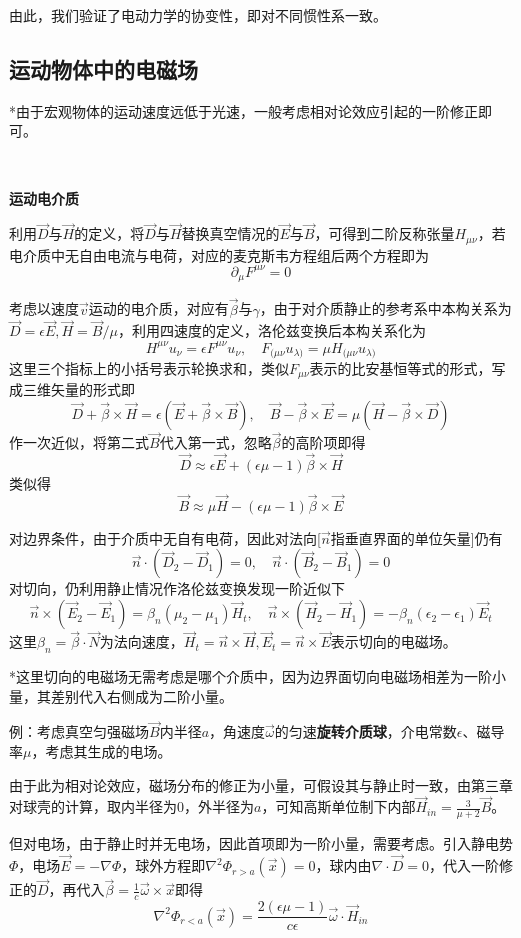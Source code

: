 \documentclass[a4paper,UTF8,fontset=windows]{ctexart}
\newcommand*{\vb}{\vec{B}}
\newcommand*{\vd}{\vec{D}}
\newcommand*{\ve}{\vec{E}}
\newcommand*{\vh}{\vec{H}}
\newcommand*{\vn}{\vec{N}}
\newcommand*{\vns}{\vec{n}}
\newcommand*{\vvs}{\vec{v}}
\newcommand*{\vx}{\vec{x}}
\newcommand*{\vbeta}{\vec{\beta}}
\newcommand*{\vomega}{\vec{\omega}}
\begin{document}
由此，我们验证了电动力学的协变性，即对不同惯性系一致。

\subsection{运动物体中的电磁场}
*由于宏观物体的运动速度远低于光速，一般考虑相对论效应引起的一阶修正即可。

\

\textbf{运动电介质}

利用$\vd$与$\vh$的定义，将$\vd$与$\vh$替换真空情况的$\ve$与$\vb$，可得到二阶反称张量$H_{\mu\nu}$，若电介质中无自由电流与电荷，对应的麦克斯韦方程组后两个方程即为
$$\partial_\mu F^{\mu\nu}=0$$

考虑以速度$\vvs$运动的电介质，对应有$\vbeta$与$\gamma$，由于对介质静止的参考系中本构关系为$\vd=\epsilon\ve,\vh=\vb/\mu$，利用四速度的定义，洛伦兹变换后本构关系化为
$$H^{\mu\nu}u_\nu=\epsilon F^{\mu\nu}u_\nu,\quad F_{(\mu\nu}u_{\lambda)}=\mu H_{(\mu\nu}u_{\lambda)}$$
这里三个指标上的小括号表示轮换求和，类似$F_{\mu\nu}$表示的比安基恒等式的形式，写成三维矢量的形式即
$$\vd+\vbeta\times\vh=\epsilon(\ve+\vbeta\times\vb),\quad\vb-\vbeta\times\ve=\mu(\vh-\vbeta\times\vd)$$
作一次近似，将第二式$\vb$代入第一式，忽略$\vbeta$的高阶项即得
$$\vd\approx\epsilon\ve+(\epsilon\mu-1)\vbeta\times\vh$$
类似得
$$\vb\approx\mu\vh-(\epsilon\mu-1)\vbeta\times\ve$$

对边界条件，由于介质中无自有电荷，因此对法向[$\vns$指垂直界面的单位矢量]仍有
$$\vns\cdot(\vd_2-\vd_1)=0,\quad\vns\cdot(\vb_2-\vb_1)=0$$
对切向，仍利用静止情况作洛伦兹变换发现一阶近似下
$$\vns\times(\ve_2-\ve_1)=\beta_n(\mu_2-\mu_1)\vh_t,\quad\vns\times(\vh_2-\vh_1)=-\beta_n(\epsilon_2-\epsilon_1)\ve_t$$
这里$\beta_n=\vbeta\cdot\vn$为法向速度，$\vh_t=\vns\times\vh,\ve_t=\vns\times\ve$表示切向的电磁场。

*这里切向的电磁场无需考虑是哪个介质中，因为边界面切向电磁场相差为一阶小量，其差别代入右侧成为二阶小量。

例：考虑真空匀强磁场$\vb$内半径$a$，角速度$\vomega$的匀速\textbf{旋转介质球}，介电常数$\epsilon$、磁导率$\mu$，考虑其生成的电场。

由于此为相对论效应，磁场分布的修正为小量，可假设其与静止时一致，由第三章对球壳的计算，取内半径为0，外半径为$a$，可知高斯单位制下内部$\vh_{in}=\frac{3}{\mu+2}\vb$。

但对电场，由于静止时并无电场，因此首项即为一阶小量，需要考虑。引入静电势$\Phi$，电场$\ve=-\nabla\Phi$，球外方程即$\nabla^2\Phi_{r>a}(\vx)=0$，球内由$\nabla\cdot\vd=0$，代入一阶修正的$\vd$，再代入$\vbeta=\frac{1}{c}\vomega\times\vx$即得
$$\nabla^2\Phi_{r<a}(\vx)=\frac{2(\epsilon\mu-1)}{c\epsilon}\vomega\cdot\vh_{in}$$
\end{document}

